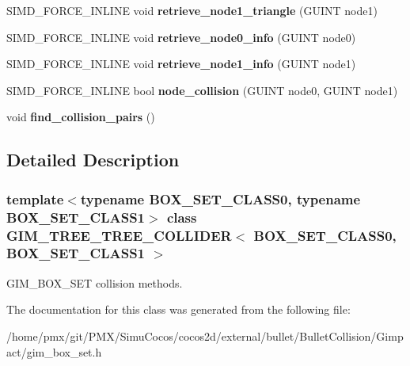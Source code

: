 \begin{DoxyCompactItemize}
S\+I\+M\+D\+\_\+\+F\+O\+R\+C\+E\+\_\+\+I\+N\+L\+I\+NE void {\bfseries retrieve\+\_\+node1\+\_\+triangle} (G\+U\+I\+NT node1)
\item 
\mbox{\label{classGIM__TREE__TREE__COLLIDER_a59ceb8b0c49c0b5ef0d8a967f166c15c}} 
S\+I\+M\+D\+\_\+\+F\+O\+R\+C\+E\+\_\+\+I\+N\+L\+I\+NE void {\bfseries retrieve\+\_\+node0\+\_\+info} (G\+U\+I\+NT node0)
\item 
\mbox{\label{classGIM__TREE__TREE__COLLIDER_aa516f21e2bb2fb59112700ee3fac660f}} 
S\+I\+M\+D\+\_\+\+F\+O\+R\+C\+E\+\_\+\+I\+N\+L\+I\+NE void {\bfseries retrieve\+\_\+node1\+\_\+info} (G\+U\+I\+NT node1)
\item 
\mbox{\label{classGIM__TREE__TREE__COLLIDER_a7c4233b51e834c5ccbdd22f5dd7ff55d}} 
S\+I\+M\+D\+\_\+\+F\+O\+R\+C\+E\+\_\+\+I\+N\+L\+I\+NE bool {\bfseries node\+\_\+collision} (G\+U\+I\+NT node0, G\+U\+I\+NT node1)
\item 
\mbox{\label{classGIM__TREE__TREE__COLLIDER_a7567c0cde6b2271a48661bfe7c5b162d}} 
void {\bfseries find\+\_\+collision\+\_\+pairs} ()
\end{DoxyCompactItemize}


\subsection{Detailed Description}
\subsubsection*{template$<$typename B\+O\+X\+\_\+\+S\+E\+T\+\_\+\+C\+L\+A\+S\+S0, typename B\+O\+X\+\_\+\+S\+E\+T\+\_\+\+C\+L\+A\+S\+S1$>$\newline
class G\+I\+M\+\_\+\+T\+R\+E\+E\+\_\+\+T\+R\+E\+E\+\_\+\+C\+O\+L\+L\+I\+D\+E\+R$<$ B\+O\+X\+\_\+\+S\+E\+T\+\_\+\+C\+L\+A\+S\+S0, B\+O\+X\+\_\+\+S\+E\+T\+\_\+\+C\+L\+A\+S\+S1 $>$}

G\+I\+M\+\_\+\+B\+O\+X\+\_\+\+S\+ET collision methods. 

The documentation for this class was generated from the following file\+:\begin{DoxyCompactItemize}
\item 
/home/pmx/git/\+P\+M\+X/\+Simu\+Cocos/cocos2d/external/bullet/\+Bullet\+Collision/\+Gimpact/gim\+\_\+box\+\_\+set.\+h\end{DoxyCompactItemize}
